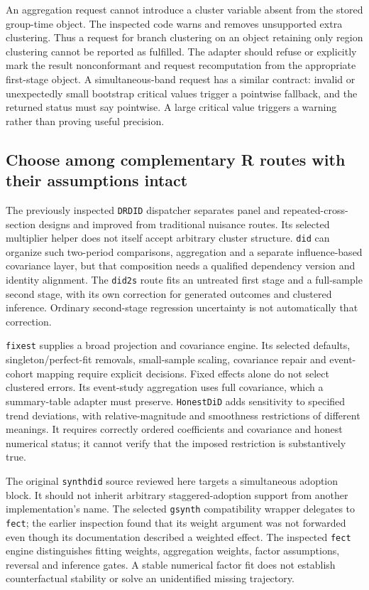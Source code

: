 An aggregation request cannot introduce a cluster variable absent from the
stored group-time object. The inspected code warns and removes unsupported
extra clustering. Thus a request for branch clustering on an object retaining
only region clustering cannot be reported as fulfilled. The adapter should
refuse or explicitly mark the result nonconformant and request recomputation
from the appropriate first-stage object. A simultaneous-band request has a
similar contract: invalid or unexpectedly small bootstrap critical values
trigger a pointwise fallback, and the returned status must say pointwise.
A large critical value triggers a warning rather than proving useful precision.
\citep{exec24_panelr_did,exec24_panelr_contract}

\subsection{Choose among complementary R routes with their assumptions intact}
The previously inspected \texttt{DRDID} dispatcher separates panel and
repeated-cross-section designs and improved from traditional nuisance routes.
Its selected multiplier helper does not itself accept arbitrary cluster
structure. \texttt{did} can organize such two-period comparisons, aggregation
and a separate influence-based covariance layer, but that composition needs
a qualified dependency version and identity alignment. The \texttt{did2s}
route fits an untreated first stage and a full-sample second stage, with
its own correction for generated outcomes and clustered inference. Ordinary
second-stage regression uncertainty is not automatically that correction.
\citep{exec24_drdid_reuse_source,exec24_did2s_reuse_source}

\texttt{fixest} supplies a broad projection and covariance engine. Its
selected defaults, singleton/perfect-fit removals, small-sample scaling,
covariance repair and event-cohort mapping require explicit decisions.
Fixed effects alone do not select clustered errors. Its event-study
aggregation uses full covariance, which a summary-table adapter must preserve.
\texttt{HonestDiD} adds sensitivity to specified trend deviations, with
relative-magnitude and smoothness restrictions of different meanings. It
requires correctly ordered coefficients and covariance and honest numerical
status; it cannot verify that the imposed restriction is substantively true.
\citep{exec20_fixest_source,exec22_honestdid_engine}

The original \texttt{synthdid} source reviewed here targets a simultaneous
adoption block. It should not inherit arbitrary staggered-adoption support
from another implementation's name. The selected \texttt{gsynth} compatibility
wrapper delegates to \texttt{fect}; the earlier inspection found that its
weight argument was not forwarded even though its documentation described a
weighted effect. The inspected \texttt{fect} engine distinguishes fitting
weights, aggregation weights, factor assumptions, reversal and inference
gates. A stable numerical factor fit does not establish counterfactual
stability or solve an unidentified missing trajectory.
\citep{exec23_synthdid_reuse_source,exec21_gsynth_wrapper,exec21_gsynth_engine}

